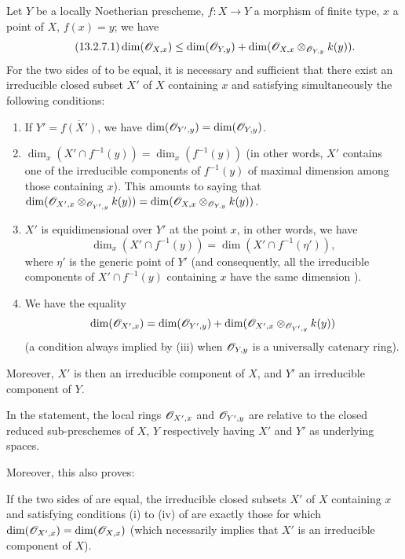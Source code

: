 \begin{proposition}[13.2.7]
\label{IV.13.2.7}
Let $Y$ be a locally Noetherian prescheme, $f:X\to Y$ a morphism of finite type, $x$ a point of $X$, $f(x)=y$; we have
\[
\tag{13.2.7.1}
\label{IV.13.2.7.1}
  \dim(\mathscr{O}_{X,x})\leq\dim(\mathscr{O}_{Y,y})+\dim(\mathscr{O}_{X,x}\otimes_{\mathscr{O}_{Y,y}}k(y)).
\]
For the two sides of  to be equal, it is necessary and sufficient that there exist an irreducible closed subset $X'$ of $X$ containing $x$ and satisfying simultaneously the following conditions:
\begin{enumerate}[label=(\roman*)]
  \item If $Y'=\overline{f(X')}$, we have $\dim(\mathscr{O}_{Y',y})=\dim(\mathscr{O}_{Y,y})$.
  \item $\dim_x(X'\cap f^{-1}(y))=\dim_x(f^{-1}(y))$ (in other words, $X'$ contains one of the irreducible components of $f^{-1}(y)$ of maximal dimension among those containing $x$). This amounts to saying that $\dim(\mathscr{O}_{X',x}\otimes_{\mathscr{O}_{Y',y}}k(y))=\dim(\mathscr{O}_{X,x}\otimes_{\mathscr{O}_{Y,y}}k(y))$.
  \item $X'$ is equidimensional over $Y'$ at the point $x$, in other words, we have
  \[
    \dim_x(X'\cap f^{-1}(y))=\dim(X'\cap f^{-1}(\eta')),
  \]
  where $\eta'$ is the generic point of $Y'$ (and consequently, all the irreducible components of $X'\cap f^{-1}(y)$ containing $x$ have the same dimension ).
  \item We have the equality
  \[
    \dim(\mathscr{O}_{X',x})=\dim(\mathscr{O}_{Y',y})+\dim(\mathscr{O}_{X',x}\otimes_{\mathscr{O}_{Y',y}}k(y))
  \]
  (a condition always implied by (iii) when $\mathscr{O}_{Y,y}$ is a universally catenary ring).
\end{enumerate}
Moreover, $X'$ is then an irreducible component of $X$, and $Y'$ an irreducible component of $Y$.
\end{proposition}

In the statement, the local rings $\mathscr{O}_{X',x}$ and $\mathscr{O}_{Y',y}$ are relative to the closed reduced sub-preschemes of $X$, $Y$ respectively having $X'$ and $Y'$ as underlying spaces.

Moreover, this also proves:

\begin{corollary}[13.2.8]
\label{IV.13.2.8}
If the two sides of  are equal, the irreducible closed subsets $X'$ of $X$ containing $x$ and satisfying conditions (i) to (iv) of  are exactly those for which $\dim(\mathscr{O}_{X',x})=\dim(\mathscr{O}_{X,x})$ (which necessarily implies that $X'$ is an irreducible component of $X$).
\end{corollary}

